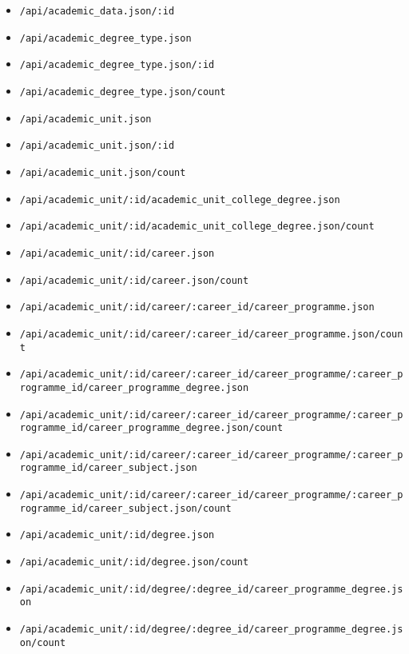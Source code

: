 \begingroup
  \begin{itemize}
    \item \lstinline$/api/academic_data.json/:id$
    \item \lstinline$/api/academic_degree_type.json$
    \item \lstinline$/api/academic_degree_type.json/:id$
    \item \lstinline$/api/academic_degree_type.json/count$
    \item \lstinline$/api/academic_unit.json$
    \item \lstinline$/api/academic_unit.json/:id$
    \item \lstinline$/api/academic_unit.json/count$
    \item \lstinline$/api/academic_unit/:id/academic_unit_college_degree.json$
    \item \lstinline$/api/academic_unit/:id/academic_unit_college_degree.json/count$
    \item \lstinline$/api/academic_unit/:id/career.json$
    \item \lstinline$/api/academic_unit/:id/career.json/count$
    \item \lstinline$/api/academic_unit/:id/career/:career_id/career_programme.json$
    \item \lstinline$/api/academic_unit/:id/career/:career_id/career_programme.json/count$
    \item \lstinline$/api/academic_unit/:id/career/:career_id/career_programme/:career_programme_id/career_programme_degree.json$
    \item \lstinline$/api/academic_unit/:id/career/:career_id/career_programme/:career_programme_id/career_programme_degree.json/count$
    \item \lstinline$/api/academic_unit/:id/career/:career_id/career_programme/:career_programme_id/career_subject.json$
    \item \lstinline$/api/academic_unit/:id/career/:career_id/career_programme/:career_programme_id/career_subject.json/count$
    \item \lstinline$/api/academic_unit/:id/degree.json$
    \item \lstinline$/api/academic_unit/:id/degree.json/count$
    \item \lstinline$/api/academic_unit/:id/degree/:degree_id/career_programme_degree.json$
    \item \lstinline$/api/academic_unit/:id/degree/:degree_id/career_programme_degree.json/count$

\end{itemize}
